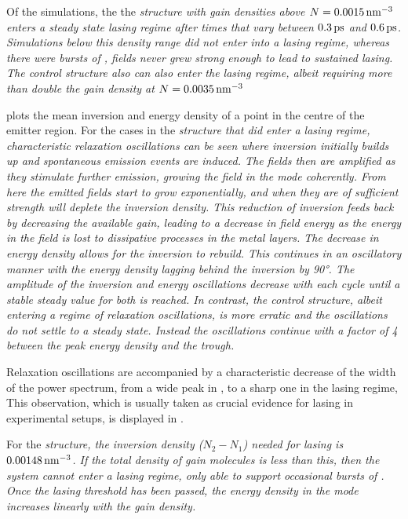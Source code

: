 Of the simulations, the the \sl structure with gain densities above
$N=0.0015\operatorname{nm}^{-3}$ enters a steady state lasing regime after times that vary
between $0.3\operatorname{ps}$ and $0.6\operatorname{ps}$.
Simulations below this density range did not enter into a lasing regime, whereas
there were bursts of \ase, fields never grew strong enough
to lead to sustained lasing.
The control structure also can also enter the lasing regime, albeit requiring
more than double the gain density at $N=0.0035\operatorname{nm}^{-3}$

 plots the mean inversion and energy density of a
point in the centre of the emitter region.
For the cases in the \sl structure that did enter a lasing regime,
characteristic relaxation oscillations can be seen where inversion initially
builds up and spontaneous emission events are induced.
The fields then are amplified as they stimulate further emission, growing the
field in the mode coherently.
From here the emitted fields start to grow exponentially, and when they are of
sufficient strength will deplete the inversion density.
This reduction of inversion feeds back by decreasing the available gain,
leading to a decrease in field energy as the energy in the field is lost to
dissipative processes in the metal layers.
The decrease in energy density allows for the inversion to rebuild.
This continues in an oscillatory manner with the energy density lagging
behind the inversion by 90°.
The amplitude of the inversion and energy oscillations decrease with each
cycle until a stable steady value for both is reached.
In contrast, the control structure, albeit entering a regime of relaxation
oscillations, is more erratic and the oscillations do not settle to a steady
state.
Instead the oscillations continue with a factor of 4 between the peak energy
density and the trough.

Relaxation oscillations are accompanied by a characteristic decrease of the
width of the power spectrum, from a wide peak in \ase,
to a sharp one in the lasing regime, This observation, which is usually taken
as crucial evidence for lasing in experimental setups, is displayed in
.

For the \sl structure, the inversion density ($N_2-N_1$) needed for lasing is
$0.00148\operatorname{nm}^{-3}$.
If the total density of gain molecules is less than this, then the system
cannot enter a lasing regime, only able to support occasional bursts of
\ase.
Once the lasing threshold has been passed, the energy density in the mode
increases linearly with the gain density.

